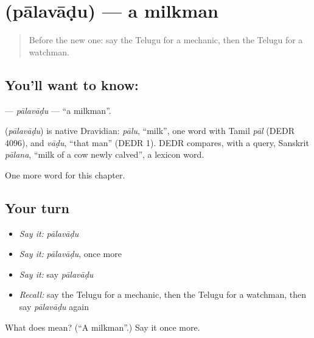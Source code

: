 \section[\texorpdfstring{\te{పాలవాడు} (pālavāḍu)}{పాలవాడు (pālavāḍu)}]{ (pālavāḍu) — a milkman}

\label{lesson:TE-C314-palavadu}



\begin{quote}
Before the new one: say the Telugu for a mechanic, then the Telugu for a watchman.
\end{quote}

\subsection*{You'll want to know: }
\textbf{} — \emph{pālavāḍu} — \textquotedblleft{}a milkman\textquotedblright{}.

\begin{cousinweb}
\textbf{} (\emph{pālavāḍu}) is native Dravidian: \emph{pālu}, \textquotedblleft{}milk\textquotedblright{}, one word with Tamil \emph{pāl} (DEDR 4096), and \emph{vāḍu}, \textquotedblleft{}that man\textquotedblright{} (DEDR 1). DEDR compares, with a query, Sanskrit \emph{pālana}, \textquotedblleft{}milk of a cow newly calved\textquotedblright{}, a lexicon word.
\end{cousinweb}

\begin{grammarlens}[title={What you've built}]
One more word for this chapter.
\end{grammarlens}

\subsection*{Your turn}
\begin{itemize}
\raggedright
  \item \emph{Say it:} \emph{pālavāḍu}
  \item \emph{Say it:} \emph{pālavāḍu}, once more
  \item \emph{Say it:} say \emph{pālavāḍu}
  \item \emph{Recall:} say the Telugu for a mechanic, then the Telugu for a watchman, then say \emph{pālavāḍu} again
\end{itemize}

\begin{tcolorbox}[breakable,colback=teal!4,colframe=teal!35!black,title={Before you move on}]
What does  mean? (\textquotedblleft{}A milkman\textquotedblright{}.) Say it once more.
\end{tcolorbox}
